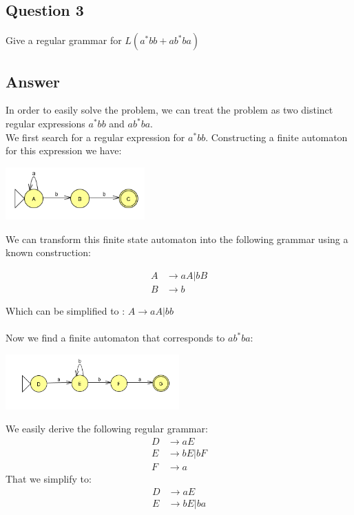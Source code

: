 \newpage

\subsection*{Question 3}

\noindent [5 pts] Give a regular grammar for $L(a^*bb + ab^*ba)$

\subsection*{Answer}

\noindent In order to easily solve the problem, we can treat the problem as two distinct regular expressions $a^*bb$ and $ab^*ba$.\\
\noindent We first search for a regular expression for $a^*bb$. Constructing a finite automaton for this expression we have:

\begin{center}
    \includegraphics[width=0.4\textwidth]{img/graph4.png}
\end{center}
\noindent We can transform this finite state automaton into the following grammar using a known construction:

\begin{align*}
    A &\rightarrow aA | bB \\
    B &\rightarrow b
\end{align*}

\noindent Which can be simplified to : $A \rightarrow aA | bb$\\ \\
Now we find a finite automaton that corresponds to $ab^*ba$:
\begin{center}
    \includegraphics[width=0.5\textwidth]{img/graph5.png}
\end{center}
\noindent We easily derive the following regular grammar:
\begin{align*}
    D &\rightarrow aE \\
    E &\rightarrow bE | bF \\
    F &\rightarrow a
\end{align*}
\noindent That we simplify to:
\begin{align*}
    D &\rightarrow aE \\
    E &\rightarrow bE | ba
\end{align*} \\

